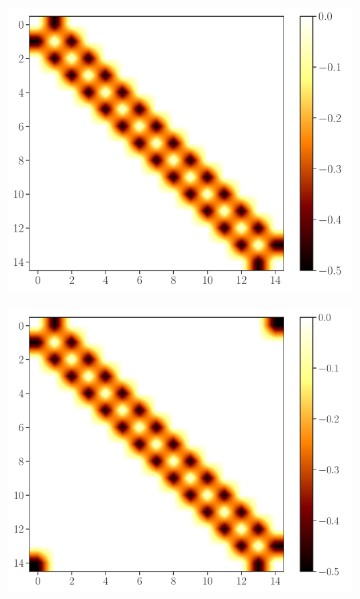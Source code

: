 \documentclass[11pt, a4paper]{article}
\theoremstyle{definition} %
\begin{document}
\begin{figure}[h]
\centering
		\begin{subfigure}[b]{0.31\textwidth}
			\includegraphics[width=\textwidth]{ColorMapMatrices_OBC}
			\caption{}
		\end{subfigure}
		\begin{subfigure}[b]{0.31\textwidth}
			\includegraphics[width=\textwidth]{ColorMapMatrices_PBC}
			\caption{}
		\end{subfigure}
		\begin{subfigure}[b]{0.31\textwidth}

\end{subfigure}
\end{figure}
\end{document}
